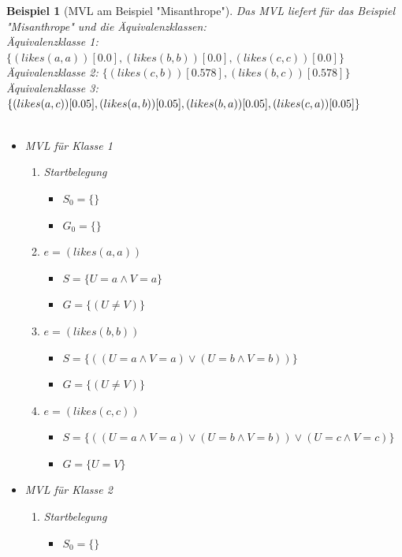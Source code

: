 \documentclass[a4paper, 11pt]{book}
\newtheorem{Bsp}{Beispiel}[section]
\begin{document}
\begin{Bsp}[MVL am Beispiel "{}Misanthrope"{}]
	Das MVL liefert für das Beispiel "{}Misanthrope"{} und die Äquivalenzklassen:\\
Äquivalenzklasse 1: $ \{(likes(a,a))[0.0], (likes(b,b))[0.0], (likes(c,c))[0.0]\} $\\
Äquivalenzklasse 2: $ \{(likes(c,b))[0.578], (likes(b,c))[0.578]\} $\\
Äquivalenzklasse 3: $ \{(likes(a,c))[0.05], (likes(a,b))[0.05], (likes(b,a))[0.05],\\ (likes(c,a))[0.05]\} $\\
\\
\noindent
\begin{itemize}
	\item MVL für Klasse 1
	\begin{enumerate}
		\item Startbelegung
		\begin{itemize}
			\item $ S_0 = \{\}$ 
			\item $ G_0 = \{\} $
		\end{itemize}
		\item $ e = (likes(a,a)) $
		\begin{itemize}
			\item $ S = \{U = a \land V = a\}$ 
			\item $ G = \{(U \neq V)\} $
		\end{itemize}
		\item $ e = (likes(b,b)) $
		\begin{itemize}
			\item $ S = \{((U = a \land V = a) \lor (U = b \land V = b))\}$ 
			\item $ G = \{(U \neq V)\} $
		\end{itemize}
		\item $ e = (likes(c,c)) $
		\begin{itemize}
		    \item $ S = \{((U = a \land V = a) \lor (U = b \land V = b)) \lor (U = c \land V = c)\}$ 
			\item $ G = \{U = V\} $
		\end{itemize}	
	\end{enumerate}
	\item MVL für Klasse 2
	\begin{enumerate}
		\item Startbelegung
		\begin{itemize}
			\item $ S_0 = \{\}$ 

\end{itemize}
\end{enumerate}
\end{itemize}
\end{Bsp}
\end{document}
